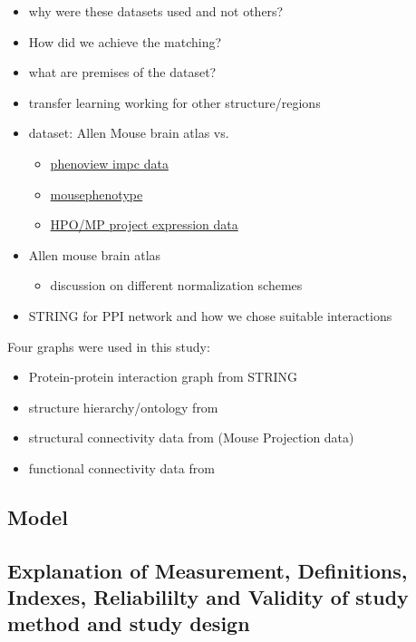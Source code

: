 \documentclass[]{article}
\renewcommand{\cite}{\citep}
\begin{document}
\begin{itemize}
	\item why were these datasets used and not others?
	\item How did we achieve the matching?
	\item what are premises of the dataset?
	
	\item transfer learning working for other structure/regions
	\item dataset: Allen Mouse brain atlas vs. 
	\begin{itemize}
		\item \href{https://www.har.mrc.ac.uk/harwell-news/phenoview-new-tool-compare-impc-data/}{phenoview impc data}
		
		\item \href{https://www.mousephenotype.org/}{mousephenotype}
		
		\item \href{http://www.informatics.jax.org/expression.shtml}{HPO/MP project expression data}
	\end{itemize}
\end{itemize}
\begin{itemize}
	\item Allen mouse brain atlas \cite{MouseBrainAtlas}
	\begin{itemize}
		\item discussion on different normalization schemes
	\end{itemize}
	\item STRING for PPI network and how we chose suitable interactions \cite{STRINGv10}
\end{itemize}

Four graphs were used in this study:
\begin{itemize}
	\item Protein-protein interaction graph from STRING
	\item structure hierarchy/ontology from \cite{MouseBrainAtlas}
	\item structural connectivity data from (Mouse Projection data)
	\item functional connectivity data from \cite{AIDAmri2019}
\end{itemize}

\subsection{Model}
\subsection*{Explanation of Measurement, Definitions, Indexes, Reliabililty and Validity of study method and study design}
\end{document}
